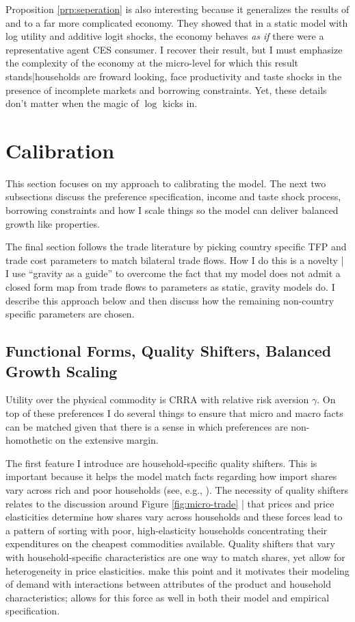 \documentclass[12pt,pdftex]{article}
\begin{document}
\begin{onehalfspacing}
Proposition \ref{prp:seperation} is also interesting because it generalizes the results of \citet*{anderson1987ces} and \citet{anderson1992discrete} to a far more complicated economy. They showed that in a static model with log utility and additive logit shocks, the economy behaves \emph{as if} there were a representative agent CES consumer. I recover their result, but I must emphasize the complexity of the economy at the micro-level for which this result stands|households are froward looking, face productivity and taste shocks in the presence of incomplete markets and borrowing constraints. Yet, these details don't matter when the magic of $\log$ kicks in.

\section{Calibration}

This section focuses on my approach to calibrating the model. The next two subsections discuss the preference specification, income and taste shock process, borrowing constraints and how I scale things so the model can deliver balanced growth like properties.

The final section follows the trade literature by picking country specific TFP and trade cost parameters to match bilateral trade flows. How I do this is a novelty | I use ``gravity as a guide'' to overcome the fact that my model does not admit a closed form map from trade flows to parameters as static, gravity models do. I describe this approach below and then discuss how the remaining non-country specific parameters are chosen.

\subsection{Functional Forms, Quality Shifters, Balanced Growth Scaling}

Utility over the physical commodity is CRRA with relative risk aversion $\gamma$. On top of these preferences I do several things to ensure that micro and macro facts can be matched given that there is a sense in which preferences are non-homothetic on the extensive margin.

The first feature I introduce are household-specific quality shifters. This is important because it helps the model match facts regarding how import shares vary across rich and poor households (see, e.g., \citet{borusyak2021distributional}). The necessity of quality shifters relates to the discussion around Figure \ref{fig:micro-trade} | that prices and price elasticities determine how shares vary across households and these forces lead to a pattern of sorting with poor, high-elasticity households concentrating their expenditures on the cheapest commodities available. Quality shifters that vary with household-specific characteristics are one way to match shares, yet allow for heterogeneity in price elasticities. \citet{berry1995automobile} make this point and it motivates their modeling of demand with interactions between attributes of the product and household characteristics; \citet{auer2022unequal} allows for this force as well in both their model and empirical specification.


\end{onehalfspacing}
\end{document}
